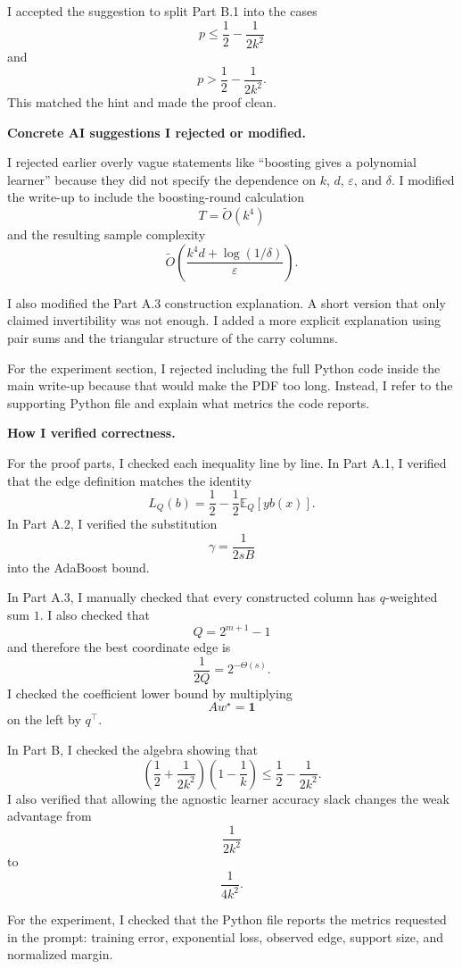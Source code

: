 \documentclass[11pt]{article}
\newcommand{\E}{\mathbb{E}}
\newcommand{\eps}{\varepsilon}
\begin{document}
\begin{solutionbox}
I accepted the suggestion to split Part B.1 into the cases
\[
p\le \frac12-\frac{1}{2k^2}
\]
and
\[
p> \frac12-\frac{1}{2k^2}.
\]
This matched the hint and made the proof clean.

\medskip

\textbf{Concrete AI suggestions I rejected or modified.}

I rejected earlier overly vague statements like ``boosting gives a polynomial learner'' because they
did not specify the dependence on $k$, $d$, $\eps$, and $\delta$. I modified the write-up to include
the boosting-round calculation
\[
T=\widetilde O(k^4)
\]
and the resulting sample complexity
\[
\widetilde O\left(\frac{k^4d+\log(1/\delta)}{\eps}\right).
\]

I also modified the Part A.3 construction explanation. A short version that only claimed
invertibility was not enough. I added a more explicit explanation using pair sums and the triangular
structure of the carry columns.

For the experiment section, I rejected including the full Python code inside the main write-up
because that would make the PDF too long. Instead, I refer to the supporting Python file and explain
what metrics the code reports.

\medskip

\textbf{How I verified correctness.}

For the proof parts, I checked each inequality line by line. In Part A.1, I verified that the edge
definition matches the identity
\[
L_Q(b)=\frac12-\frac12\E_Q[yb(x)].
\]
In Part A.2, I verified the substitution
\[
\gamma=\frac{1}{2sB}
\]
into the AdaBoost bound.

In Part A.3, I manually checked that every constructed column has $q$-weighted sum $1$. I also
checked that
\[
Q=2^{m+1}-1
\]
and therefore the best coordinate edge is
\[
\frac{1}{2Q}=2^{-\Theta(s)}.
\]
I checked the coefficient lower bound by multiplying
\[
Aw^\star=\mathbf 1
\]
on the left by $q^\top$.

In Part B, I checked the algebra showing that
\[
\left(\frac12+\frac{1}{2k^2}\right)\left(1-\frac1k\right)
\le
\frac12-\frac{1}{2k^2}.
\]
I also verified that allowing the agnostic learner accuracy slack changes the weak advantage from
\[
\frac{1}{2k^2}
\]
to
\[
\frac{1}{4k^2}.
\]

For the experiment, I checked that the Python file reports the metrics requested in the prompt:
training error, exponential loss, observed edge, support size, and normalized margin.


\end{solutionbox}
\end{document}
